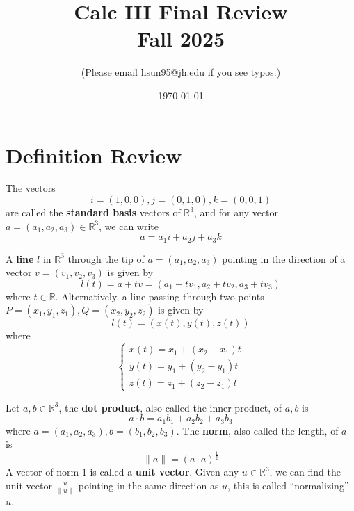 \documentclass[openany]{book}
\title{Calc III Final Review
\\ 
\vspace{0.4cm}
\large Fall 2025}
\author{(Please email hsun95@jh.edu if you see typos.)}
\date{\today}
\newcommand{\R}{\mathbb{R}}
\begin{document}
\maketitle

\tableofcontents
\newpage


\chapter{Definition Review}


\begin{defn}[standard basis in $\R^3$]
    The vectors 
    \begin{equation*}
        i=(1,0,0), j=(0,1,0), k=(0,0,1)
    \end{equation*}
    are called the \textbf{standard basis} vectors of $\R^3$, and for any vector $a=(a_1,a_2,a_3)\in\R^3$, we can write 
    \begin{equation*}
        a=a_1i+a_2j+a_3k
    \end{equation*}
\end{defn}



\begin{defn}\label{line}
    A \textbf{line} $l$ in $\R^3$ through the tip of $a=(a_1,a_2,a_3)$ pointing in the direction of a vector $v=(v_1,v_2,v_3)$ is given by 
    \begin{equation*}
        l(t)=a+tv=(a_1+tv_1, a_2+tv_2, a_3+tv_3)
    \end{equation*}
    where $t\in\R$. Alternatively, a line passing through two points $P=(x_1,y_1,z_1), Q=(x_2,y_2,z_2)$ is given by 
    \begin{equation*}
        l(t)=(x(t), y(t), z(t))
    \end{equation*}
    where 
    \begin{equation*}
        \begin{cases}
            x(t)=x_1+(x_2-x_1)t\\
            y(t)=y_1+(y_2-y_1)t\\
            z(t)=z_1+(z_2-z_1)t
        \end{cases}
    \end{equation*}
\end{defn}



\begin{defn}
    Let $a,b\in\R^3$, the \textbf{dot product}, also called the inner product, of $a,b$ is 
    \begin{equation*}
        a\cdot b=a_1b_1+a_2b_2+a_3b_3
    \end{equation*}
    where $a=(a_1,a_2,a_3), b=(b_1,b_2,b_3)$. The \textbf{norm}, also called the length, of $a$ is 
    \begin{equation*}
        \|a\|=(a\cdot a)^\frac{1}{2}
    \end{equation*}
    A vector of norm $1$ is called a \textbf{unit vector}. Given any $u\in\R^3$, we can find the unit vector $\frac{u}{\|u\|}$ pointing in the same direction as $u$, this is called ``normalizing'' $u$.
\end{defn}
\end{document}
